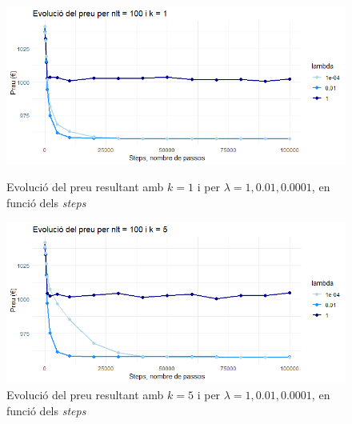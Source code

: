 \documentclass[a4paper]{article}
\begin{document}
	\begin{figure}[H]
		\centering
		\begin{minipage}{0.45\textwidth}
			\centering
			\includegraphics[width=\textwidth]{images/exp3_k1.png}
			\caption{Evolució del preu resultant amb $k=1$ i per $\lambda = {1, 0.01, 0.0001}$, en funció dels \textit{steps}}
			\label{fig:exp3_k1}
		\end{minipage}%
		\hspace{0.05\textwidth} %
		\begin{minipage}{0.45\textwidth}
			\centering
			\includegraphics[width=\textwidth]{images/exp3_k5.png}
			\caption{Evolució del preu resultant amb $k=5$ i per $\lambda = {1,0.01,0.0001}$, en funció dels \textit{steps}}
			\label{fig:exp3_k5}
		\end{minipage}
	\end{figure}
	
\end{document}
